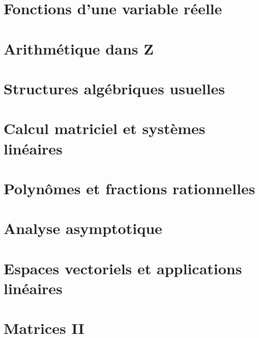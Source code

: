 \documentclass[a4paper, 10pt, twoside]{report}
\begin{document}
    

\chapter{Fonctions d'une variable réelle}

    

\chapter{Arithmétique dans $\mathbf{Z}$}

    

\chapter{Structures algébriques usuelles}

    
    
\chapter{Calcul matriciel et systèmes linéaires}

    
        
\chapter{Polynômes et fractions rationnelles}

    

\chapter{Analyse asymptotique}

    
        
\chapter{Espaces vectoriels et applications linéaires}

    

\chapter{Matrices II}

    
    
\end{document}
